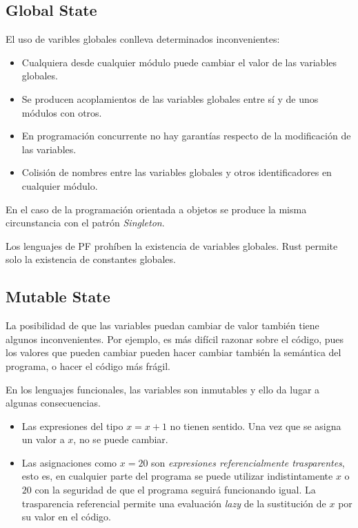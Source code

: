 \subsection{Global State}
\noindent El uso de varibles globales conlleva determinados inconvenientes:
\begin{itemize}
   \item Cualquiera desde cualquier módulo puede cambiar el valor de las variables globales.
   \item Se producen acoplamientos de las variables globales entre sí y de unos módulos con otros.
   \item En programación concurrente no hay garantías respecto de la modificación de las variables.
   \item Colisión de nombres entre las variables globales y otros identificadores en cualquier módulo.
\end{itemize}

En el caso de la programación orientada a objetos se produce la misma circunstancia con el patrón \textit{Singleton}.

Los lenguajes de PF prohíben la existencia de variables globales. Rust permite solo la existencia de constantes globales.

\subsection{Mutable State}
\noindent La posibilidad de que las variables puedan cambiar de valor también tiene algunos inconvenientes. Por ejemplo, es más difícil razonar sobre el código, pues los valores que pueden cambiar pueden hacer cambiar también la semántica del programa, o hacer el código más frágil.

En los lenguajes funcionales, las variables son inmutables y ello da lugar a algunas consecuencias.
\begin{itemize}
   \item Las expresiones del tipo $x = x +1$ no tienen sentido. Una vez que se asigna un valor a $x$, no se puede cambiar.
   \item Las asignaciones como $x=20$ son \textit{expresiones referencialmente trasparentes}, esto es, en cualquier parte del programa se puede utilizar indistintamente $x$ o $20$ con la seguridad de que el programa seguirá funcionando igual. La trasparencia referencial permite una evaluación \textit{lazy} de la sustitución de $x$ por su valor en el código.
\end{itemize}

